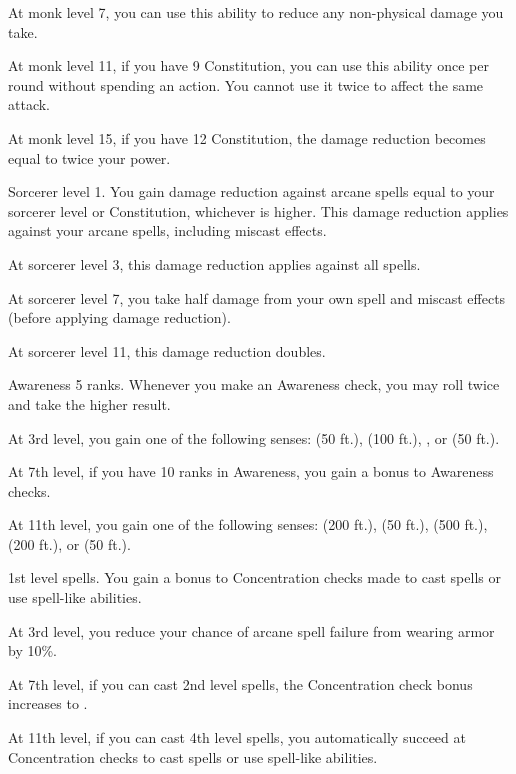     At monk level 7, you can use this ability to reduce any non-physical damage you take.

    At monk level 11, if you have 9 Constitution, you can use this ability once per round without spending an action.
    You cannot use it twice to affect the same attack.

    At monk level 15, if you have 12 Constitution, the damage reduction becomes equal to twice your \ki power.

    \featpre Sorcerer level 1.
    \featben You gain damage reduction against arcane spells equal to your sorcerer level or Constitution, whichever is higher.
    This damage reduction applies against your arcane spells, including miscast effects.

    At sorcerer level 3, this damage reduction applies against all spells.

    At sorcerer level 7, you take half damage from your own spell and miscast effects (before applying damage reduction).

    At sorcerer level 11, this damage reduction doubles.

    \featpre Awareness 5 ranks.
    \featben Whenever you make an Awareness check, you may roll twice and take the higher result.

    At 3rd level, you gain one of the following senses:  (50 ft.),  (100 ft.), , or  (50 ft.).

    At 7th level, if you have 10 ranks in Awareness, you gain a  bonus to Awareness checks.

    At 11th level, you gain one of the following senses:  (200 ft.),  (50 ft.),  (500 ft.),  (200 ft.), or  (50 ft.).

    \featpre 1st level spells.
    \featben You gain a  bonus to Concentration checks made to cast spells or use spell-like abilities.

    At 3rd level, you reduce your chance of arcane spell failure from wearing armor by 10\%.

    At 7th level, if you can cast 2nd level spells, the Concentration check bonus increases to .

    At 11th level, if you can cast 4th level spells, you automatically succeed at Concentration checks to cast spells or use spell-like abilities.

